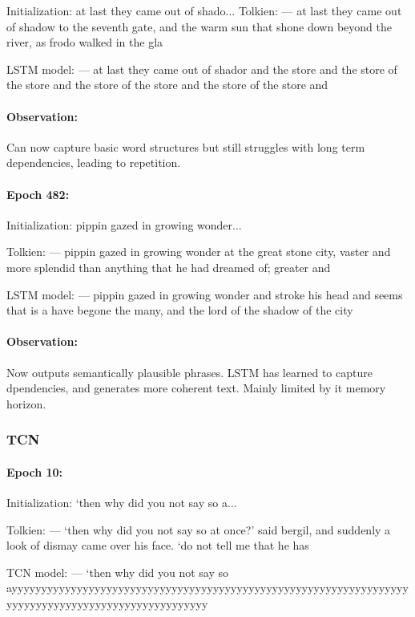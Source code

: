 \documentclass[11pt]{article}
\numberwithin{equation}{section}
\begin{document}
Initialization: at last they came out of shado... Tolkien: --- at last they came
out of shadow to the seventh gate, and the warm sun that shone down beyond the
river, as frodo walked in the gla

LSTM model: --- at last they came out of shador and the store and the store of the
store and the store of the store and the store of the store and

\paragraph{Observation:} Can now capture basic word structures but still struggles with long
term dependencies, leading to repetition.

\paragraph{Epoch 482:}

Initialization: pippin gazed in growing wonder...

Tolkien: --- pippin gazed in growing wonder at the great stone city, vaster and
more splendid than anything that he had dreamed of; greater and

LSTM model: --- pippin gazed in growing wonder and stroke his head and seems that
is a have begone the many, and the lord of the shadow of the city

\paragraph{Observation:} Now outputs semantically plausible phrases. LSTM has learned to
capture dpendencies, and generates more coherent text. Mainly limited by it memory
horizon.

\subsubsection{TCN}

\paragraph{Epoch 10:}

Initialization: ‘then why did you not say so a...

Tolkien: --- ‘then why did you not say so at once?’ said bergil, and suddenly a
look of dismay came over his face. ‘do not tell me that he has

TCN model: --- ‘then why did you not say so
ayyyyyyyyyyyyyyyyyyyyyyyyyyyyyyyyyyyyyyyyyyyyyyyyyyyyyyyyyyyyyyyyyyyyyyyyyyyyyyyyyyyyyyyyyyyyyyyyyyyyy
\end{document}
